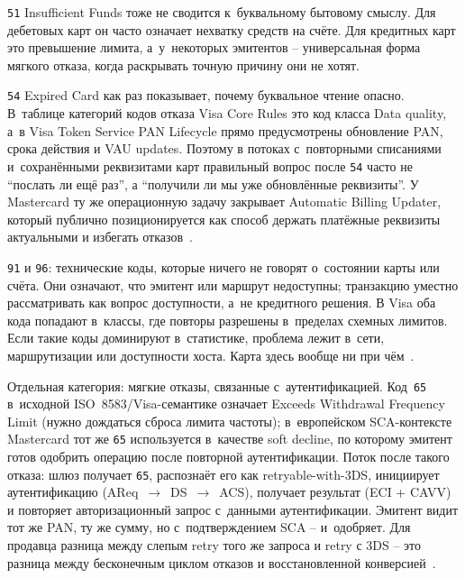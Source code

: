 \texttt{51} Insufficient Funds тоже не сводится к~буквальному бытовому
смыслу. Для дебетовых карт он часто означает нехватку
средств на счёте. Для кредитных карт это превышение лимита,
а~у~некоторых эмитентов -- универсальная форма мягкого
отказа, когда раскрывать точную причину они не хотят.

\texttt{54} Expired Card как раз показывает, почему буквальное чтение опасно.
В~таблице категорий кодов отказа Visa Core Rules это код класса
Data quality, а~в Visa Token Service
PAN Lifecycle прямо предусмотрены обновление PAN, срока действия и VAU
updates. Поэтому в потоках с~повторными списаниями и~сохранёнными реквизитами карт правильный вопрос
после \texttt{54} часто не \enquote{послать ли ещё раз}, а
\enquote{получили ли мы уже обновлённые реквизиты}. У Mastercard ту же
операционную задачу закрывает Automatic Billing Updater, который
публично позиционируется как способ держать платёжные реквизиты
актуальными
и избегать
отказов~\cite{visa-core-rules,visa-vts,visa-vau,mc-bill-pay-solutions}.

\texttt{91} и \texttt{96}: технические коды, которые ничего не говорят о~состоянии
карты или счёта. Они означают, что эмитент или маршрут недоступны;
транзакцию уместно рассматривать как вопрос доступности, а~не
кредитного решения. В Visa оба кода попадают в~классы, где
повторы разрешены в~пределах схемных лимитов. Если такие коды
доминируют в~статистике, проблема лежит в~сети,
маршрутизации или доступности хоста. Карта здесь вообще ни при чём~\cite{visa-core-rules}.

Отдельная категория: мягкие отказы, связанные с~аутентификацией.
Код~\texttt{65} в~исходной ISO~8583/Visa-семантике
означает Exceeds Withdrawal Frequency Limit (нужно дождаться
сброса лимита частоты); в~европейском SCA-контексте Mastercard
тот же \texttt{65} используется в~качестве soft decline,
по которому эмитент готов одобрить операцию после повторной
аутентификации. Поток после такого отказа: шлюз получает \texttt{65},
распознаёт его как retryable-with-3DS, инициирует
аутентификацию (AReq~$\to$~DS~$\to$~ACS), получает результат
(ECI + CAVV) и повторяет авторизационный запрос с~данными
аутентификации. Эмитент видит тот же PAN, ту же сумму, но
с~подтверждением SCA -- и~одобряет. Для продавца разница
между слепым retry того же запроса и retry с 3DS -- это
разница между бесконечным циклом отказов и восстановленной
конверсией~\cite{mc-tpr}.

